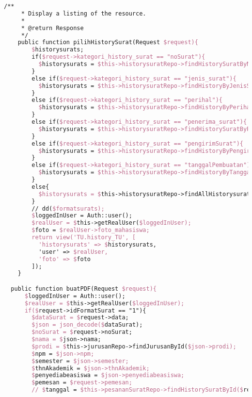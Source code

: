 \begin{lstlisting}[language=tex,basicstyle=\tiny,caption=HistorysuratController.php]
    /**
	 * Display a listing of the resource.
	 *
	 * @return Response
	 */
	public function pilihHistorySurat(Request $request){
        $historysurats;
        if($request->kategori_history_surat == "noSurat"){
          $historysurats = $this->historysuratRepo->findHistorySuratByNomorSurat($request->searchBox);
        }
        else if($request->kategori_history_surat == "jenis_surat"){
          $historysurats = $this->historysuratRepo->findHistoryByJenisSurat($request->searchBox);
        }
        else if($request->kategori_history_surat == "perihal"){
          $historysurats = $this->historysuratRepo->findHistoryByPerihal($request->searchBox);
        }
        else if($request->kategori_history_surat == "penerima_surat"){
          $historysurats = $this->historysuratRepo->findHistorySuratByPenerimaSurat($request->searchBox);
        }
        else if($request->kategori_history_surat == "pengirimSurat"){
          $historysurats = $this->historysuratRepo->findHistoryByPengirimSurat($request->searchBox);
        }
        else if($request->kategori_history_surat == "tanggalPembuatan"){
          $historysurats = $this->historysuratRepo->findHistoryByTanggalPembuatan($request->searchBox);
        }
        else{
          $historysurats = $this->historysuratRepo->findAllHistorysurat();
        }
        // dd($formatsurats);
        $loggedInUser = Auth::user();
        $realUser = $this->getRealUser($loggedInUser);
        $foto = $realUser->foto_mahasiswa;
        return view('TU.history_TU', [
          'historysurats' => $historysurats,
          'user' => $realUser,
          'foto' => $foto
        ]);
	}

  public function buatPDF(Request $request){
      $loggedInUser = Auth::user();
      $realUser = $this->getRealUser($loggedInUser);
      if($request->idFormatSurat == "1"){
        $dataSurat = $request->data;
        $json = json_decode($dataSurat);
        $noSurat = $request->noSurat;
        $nama = $json->nama;
        $prodi = $this->jurusanRepo->findJurusanById($json->prodi);
        $npm = $json->npm;
        $semester = $json->semester;
        $thnAkademik = $json->thnAkademik;
        $penyediabeasiswa = $json->penyediabeasiswa;
        $pemesan = $request->pemesan;
        // $tanggal = $this->pesananSuratRepo->findHistorySuratById($request->id)->created_at;


\end{lstlisting}
